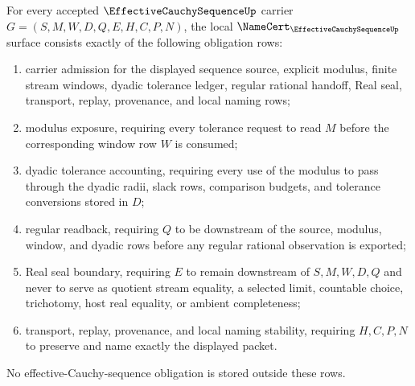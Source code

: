 \begin{theorem}\label{thm:effective-cauchy-sequence-namecert-obligations}
For every accepted $\EffectiveCauchySequenceUp$ carrier $G=(S,M,W,D,Q,E,H,C,P,N)$, the local $\NameCert_{\EffectiveCauchySequenceUp}$ surface consists exactly of the following obligation rows:
\begin{enumerate}
\item carrier admission for the displayed sequence source, explicit modulus, finite stream windows, dyadic tolerance ledger, regular rational handoff, Real seal, transport, replay, provenance, and local naming rows;
\item modulus exposure, requiring every tolerance request to read $M$ before the corresponding window row $W$ is consumed;
\item dyadic tolerance accounting, requiring every use of the modulus to pass through the dyadic radii, slack rows, comparison budgets, and tolerance conversions stored in $D$;
\item regular readback, requiring $Q$ to be downstream of the source, modulus, window, and dyadic rows before any regular rational observation is exported;
\item Real seal boundary, requiring $E$ to remain downstream of $S,M,W,D,Q$ and never to serve as quotient stream equality, a selected limit, countable choice, trichotomy, host real equality, or ambient completeness;
\item transport, replay, provenance, and local naming stability, requiring $H,C,P,N$ to preserve and name exactly the displayed packet.
\end{enumerate}
No effective-Cauchy-sequence obligation is stored outside these rows.
\end{theorem}
